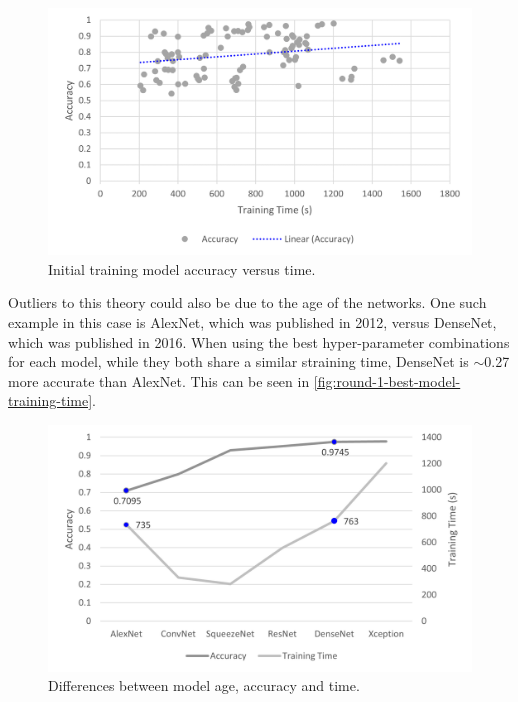 \begin{figure}[H]
    \centering
    \includegraphics[width=\textwidth]{figures/round-1-model-training-time2.png}
    \caption{Initial training model accuracy versus time.}
    \label{fig:round-1-model-training-time}
\end{figure}

Outliers to this theory could also be due to the age of the networks. One such example in this case is AlexNet, which was published in 2012, versus DenseNet, which was published in 2016. When using the best hyper-parameter combinations for each model, while they both share a similar straining time, DenseNet is $\sim$0.27 more accurate than AlexNet. This can be seen in \autoref{fig:round-1-best-model-training-time}.

\begin{figure}[H]
    \centering
    \includegraphics[width=\textwidth]{figures/round-1-best-model-training-time.png}
    \caption{Differences between model age, accuracy and time.}
    \label{fig:round-1-best-model-training-time}
\end{figure}

